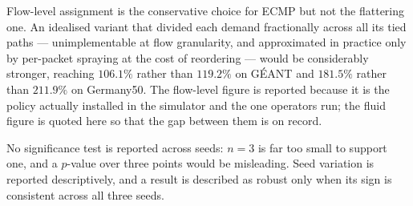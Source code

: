 Flow-level assignment is the conservative choice for ECMP but not the flattering
one. An idealised variant that divided each demand fractionally across all its
tied paths --- unimplementable at flow granularity, and approximated in practice
only by per-packet spraying at the cost of reordering --- would be considerably
stronger, reaching $106.1\%$ rather than $119.2\%$ on GÉANT and $181.5\%$ rather
than $211.9\%$ on Germany50. The flow-level figure is reported because it is the
policy actually installed in the simulator and the one operators run; the fluid
figure is quoted here so that the gap between them is on record.

No significance test is reported across seeds: $n=3$ is far too small to support
one, and a $p$-value over three points would be misleading. Seed variation is
reported descriptively, and a result is described as robust only when its sign is
consistent across all three seeds.
